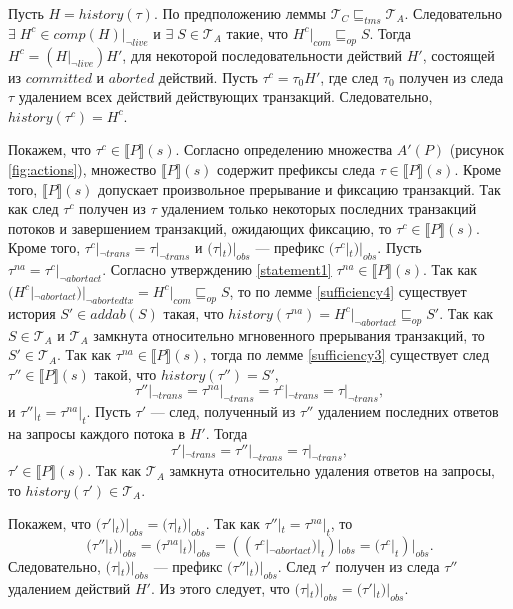 \begin{myproof}
Пусть $H = history(\tau)$. По предположению леммы $\mathcal{T}_C \sqsubseteq_{tms} \mathcal{T}_A$. Следовательно $\exists \; H^c \in comp(H)|_{\neg live}$ и $\exists \; S \in \mathcal{T}_A$ такие, что $H^c|_{com} \sqsubseteq_{op} S$. Тогда $H^c = (H|_{\neg live})H'$, для некоторой последовательности действий $H'$, состоящей из $committed$ и $aborted$ действий.  Пусть $\tau^c = \tau_0H'$, где след $\tau_0$ получен из следа $\tau$ удалением всех действий действующих транзакций. Следовательно, $history(\tau^c) = H^c$.

Покажем, что $\tau^c \in \llbracket P \rrbracket(s)$. Согласно определению множества $A'(P)$ (рисунок \ref{fig:actions}), множество $\llbracket P\rrbracket(s)$ содержит префиксы следа $\tau \in \llbracket P\rrbracket(s)$. Кроме того, $\llbracket P\rrbracket(s)$ допускает произвольное прерывание и фиксацию транзакций. Так как след $\tau^c$ получен из $\tau$ удалением только некоторых последних транзакций потоков и завершением транзакций, ожидающих фиксацию, то $\tau^c \in \llbracket P\rrbracket(s)$. Кроме того, $\tau^c|_{\neg trans} = \tau|_{\neg trans}$ и $(\tau|_t)|_{obs}$ --- префикс $(\tau^c|_t)|_{obs}$. Пусть $\tau^{na} = \tau^c|_{\neg abortact}$. Согласно утверждению \ref{statement1}
$\tau^{na} \in \llbracket P \rrbracket(s)$. Так как $(H^c|_{\neg abortact})|_{\neg abortedtx} = H^c|_{com} \sqsubseteq_{op} S$, то по лемме \ref{sufficiency4}
существует история $S' \in addab(S)$ такая, что $history(\tau^{na}) = H^c|_{\neg abortact} \sqsubseteq_{op} S'$. Так как $S \in \mathcal{T}_A$ и $\mathcal{T}_A$ замкнута относительно мгновенного прерывания транзакций, то $S' \in \mathcal{T}_A$. Так как $\tau^{na} \in \llbracket P \rrbracket(s)$, тогда по лемме \ref{sufficiency3} 
существует след $\tau'' \in \llbracket P \rrbracket(s)$ такой, что $history(\tau'') = S',$ $$\tau''|_{\neg trans} = \tau^{na}|_{\neg trans} = \tau^c|_{\neg trans} = \tau|_{\neg trans},$$
и $\tau''|_t = \tau^{na}|_t$. Пусть $\tau'$ --- след, полученный из $\tau''$ удалением последних ответов на запросы каждого потока в $H'$. Тогда $$\tau'|_{\neg trans} = \tau''|_{\neg trans} = \tau|_{\neg trans},$$ $\tau' \in \llbracket P\rrbracket(s)$. Так как $\mathcal{T}_A$ замкнута относительно удаления ответов на запросы, то $history(\tau') \in \mathcal{T}_A$.

Покажем, что $(\tau'|_t)|_{obs} = (\tau|_t)|_{obs}$. Так как $\tau''|_t = \tau^{na}|_t$, то $$(\tau''|_t)|_{obs} = (\tau^{na}|_t)|_{obs} = ((\tau^c|_{\neg abortact})|_t)|_{obs} = (\tau^c|_t)|_{obs}.$$ Следовательно, $(\tau|_t)|_{obs}$ --- префикс $(\tau''|_t)|_{obs}$. След $\tau'$ получен из следа $\tau''$ удалением действий $H'$. Из этого следует, что $(\tau|_t)|_{obs} = (\tau'|_t)|_{obs}$.
\end{myproof}
  
